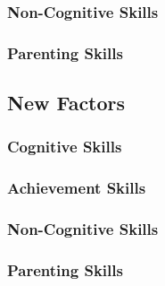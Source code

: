 \documentclass[11pt]{article}
\begin{document}
    \subsubsection{Non-Cognitive Skills}
    

    \subsubsection{Parenting Skills}
    

  \subsection{New Factors}
    \subsubsection{Cognitive Skills}

    \subsubsection{Achievement Skills}

    \subsubsection{Non-Cognitive Skills}

    \subsubsection{Parenting Skills}
\end{document}
